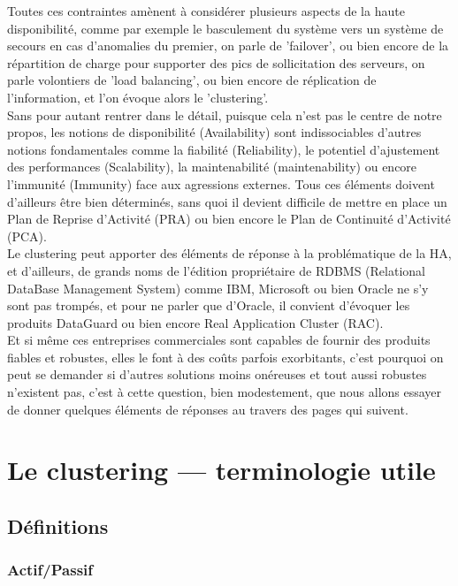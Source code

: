 \documentclass[12pt]{report}
\begin{document}
Toutes ces contraintes amènent à considérer plusieurs aspects de la haute
disponibilité, comme par exemple le basculement du système vers un système de
secours en cas d'anomalies du premier, on parle de 'failover', ou bien encore de
la répartition de charge pour supporter des pics de sollicitation des serveurs,
on parle volontiers de 'load balancing', ou bien encore de réplication de
l'information, et l'on évoque alors le 'clustering'.\\

Sans pour autant rentrer dans le détail, puisque cela n'est pas le centre de
notre propos, les notions de disponibilité (Availability) sont indissociables
d'autres notions fondamentales comme la fiabilité (Reliability), le potentiel
d'ajustement des performances (Scalability), la maintenabilité (maintenability)
ou encore l'immunité (Immunity) face aux agressions externes. Tous ces éléments
doivent d'ailleurs être bien déterminés, sans quoi il devient difficile de
mettre en place un Plan de Reprise d'Activité (PRA) ou bien encore le Plan de
Continuité d'Activité (PCA).\\

Le clustering peut apporter des éléments de réponse à la problématique de la HA,
et d'ailleurs, de grands noms de l'édition propriétaire de RDBMS (Relational
DataBase Management System) comme IBM, Microsoft ou bien Oracle ne s'y sont pas
trompés, et pour ne parler que d'Oracle, il convient d'évoquer les produits
DataGuard ou bien encore Real Application Cluster (RAC).\\

Et si même ces entreprises commerciales sont capables de fournir des produits
fiables et robustes, elles le font à des coûts parfois exorbitants, c'est
pourquoi on peut se demander si d'autres solutions moins onéreuses et tout aussi
robustes n'existent pas, c'est à cette question, bien modestement, que nous
allons essayer de donner quelques éléments de réponses au travers des pages qui
suivent.\\


\chapter{Le clustering — terminologie utile}

\section{Définitions}

\subsection{Actif/Passif}
\end{document}
